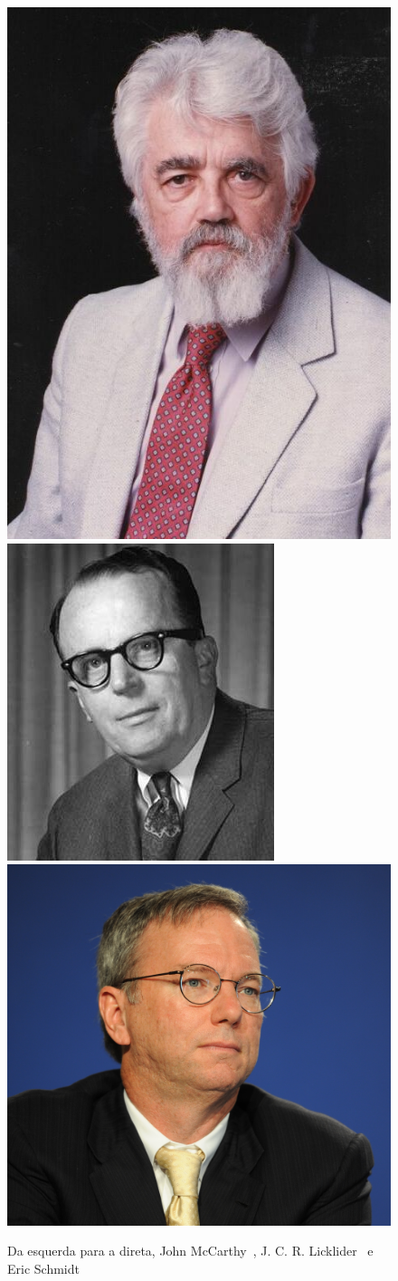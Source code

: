 \begin{figure}[ht]
    \centering
    \includegraphics[height=0.3\textwidth]{img/mcCarthy.jpg}
    \includegraphics[height=0.3\textwidth]{img/licklider.jpg}
    \includegraphics[height=0.3\textwidth]{img/schmidt.jpg}
    \caption{Da esquerda para a direta, John McCarthy~\cite{stanford-mccarthy-obit},
        J. C. R. Licklider~\cite{atimes-zoya-phantom} e Eric
        Schmidt~\cite{forbes-eric-schmidt:online}}
\end{figure}



